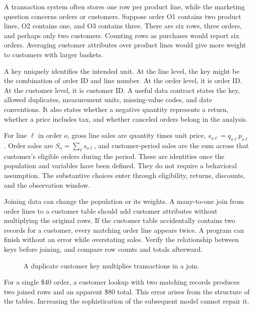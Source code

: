 \noindent A transaction system often stores one row per product line, while the
marketing question concerns orders or customers. Suppose order O1
contains two product lines, O2 contains one, and O3 contains three.
There are six rows, three orders, and perhaps only two customers.
Counting rows as purchases would report six orders. Averaging customer
attributes over product lines would give more weight to customers with
larger baskets.

A key uniquely identifies the intended unit. At the line level, the key
might be the combination of order ID and line number. At the order
level, it is order ID. At the customer level, it is customer ID. A
useful data contract states the key, allowed duplicates, measurement
units, missing-value codes, and date conventions. It also states whether
a negative quantity represents a return, whether a price includes tax,
and whether canceled orders belong in the analysis.

For line \(\ell\) in order \(o\), gross line sales are quantity times
unit price, \(s_{o\ell}=q_{o\ell}p_{o\ell}\). Order sales are
\(S_o=\sum_\ell s_{o\ell}\), and customer-period sales are the sum
across that customer's eligible orders during the period. These are
identities once the population and variables have been defined. They do
not require a behavioral assumption. The substantive choices enter
through eligibility, returns, discounts, and the observation window.

Joining data can change the population or its weights. A many-to-one
join from order lines to a customer table should add customer attributes
without multiplying the original rows. If the customer table
accidentally contains two records for a customer, every matching order
line appears twice. A program can finish without an error while
overstating sales. Verify the relationship between keys before joining,
and compare row counts and totals afterward.

\begin{figure}[htbp]
\centering

\caption{A duplicate customer key multiplies transactions in a join.}\label{fig:M01_join_multiplication}
\end{figure}

For a single \$40 order, a customer lookup with two matching records
produces two joined rows and an apparent \$80 total. This error arises
from the structure of the tables. Increasing the sophistication of the
subsequent model cannot repair it.

